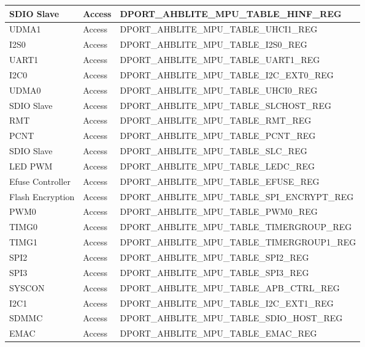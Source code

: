 \begin{longtable}[c]{|p{4cm}|p{2cm}|p{9cm}|}
    
    SDIO Slave            & Access & DPORT\_AHBLITE\_MPU\_TABLE\_HINF\_REG \\
    \hline
    UDMA1                 & Access & DPORT\_AHBLITE\_MPU\_TABLE\_UHCI1\_REG \\
    \hline
    
    
    I2S0                  & Access & DPORT\_AHBLITE\_MPU\_TABLE\_I2S0\_REG \\
    \hline
    UART1                 & Access & DPORT\_AHBLITE\_MPU\_TABLE\_UART1\_REG \\
    \hline
    
    
    I2C0                  & Access & DPORT\_AHBLITE\_MPU\_TABLE\_I2C\_EXT0\_REG \\
    \hline
    UDMA0                 & Access & DPORT\_AHBLITE\_MPU\_TABLE\_UHCI0\_REG \\
    \hline
    SDIO Slave            & Access & DPORT\_AHBLITE\_MPU\_TABLE\_SLCHOST\_REG \\
    \hline
    RMT                   & Access & DPORT\_AHBLITE\_MPU\_TABLE\_RMT\_REG \\
    \hline
    PCNT                  & Access & DPORT\_AHBLITE\_MPU\_TABLE\_PCNT\_REG \\
    \hline
    SDIO Slave            & Access & DPORT\_AHBLITE\_MPU\_TABLE\_SLC\_REG \\
    \hline
    LED PWM               & Access & DPORT\_AHBLITE\_MPU\_TABLE\_LEDC\_REG \\
    \hline
    Efuse Controller      & Access & DPORT\_AHBLITE\_MPU\_TABLE\_EFUSE\_REG \\
    \hline
    Flash Encryption      & Access & DPORT\_AHBLITE\_MPU\_TABLE\_SPI\_ENCRYPT\_REG \\
    \hline
    
    
    PWM0                  & Access & DPORT\_AHBLITE\_MPU\_TABLE\_PWM0\_REG \\
    \hline
    TIMG0                 & Access & DPORT\_AHBLITE\_MPU\_TABLE\_TIMERGROUP\_REG \\
    \hline
    TIMG1                 & Access & DPORT\_AHBLITE\_MPU\_TABLE\_TIMERGROUP1\_REG \\
    \hline
    SPI2                  & Access & DPORT\_AHBLITE\_MPU\_TABLE\_SPI2\_REG \\
    \hline
    SPI3                  & Access & DPORT\_AHBLITE\_MPU\_TABLE\_SPI3\_REG \\
    \hline
    SYSCON                & Access & DPORT\_AHBLITE\_MPU\_TABLE\_APB\_CTRL\_REG \\
    \hline
    I2C1                  & Access & DPORT\_AHBLITE\_MPU\_TABLE\_I2C\_EXT1\_REG \\
    \hline
    SDMMC                 & Access & DPORT\_AHBLITE\_MPU\_TABLE\_SDIO\_HOST\_REG \\
    \hline
    EMAC                  & Access & DPORT\_AHBLITE\_MPU\_TABLE\_EMAC\_REG \\
    \hline
    

\end{longtable}
